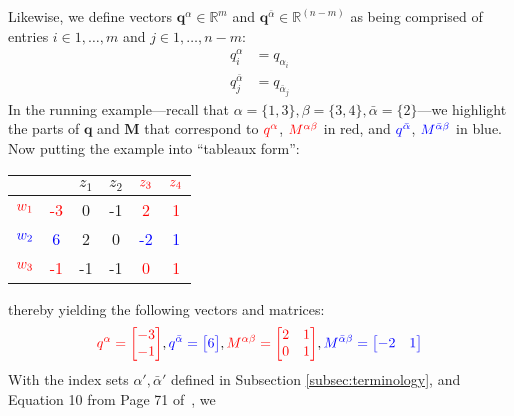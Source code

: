 \documentclass{article}
\providecommand{\vect}[1]{\bm#1}
\providecommand{\mat}[1]{\mathbf#1}
\newcommand{\1}{(\textos{1})\!}
\newcommand{\2}{(\textos{2})\!}
\newcommand{\3}{(\textos{3})\!}
\newcommand{\4}{(\textos{4})\!}
\newcommand{\5}{(\textos{5})\!}
\newcommand{\6}{(\textos{6})\!}
\newcommand{\7}{(\textos{7})\!}
\newcommand{\8}{(\textos{8})\!}
\begin{document}
Likewise, we define vectors $\vect{q}^{\alpha} \in \mathbb{R}^m$ and $\vect{q}^{\bar{\alpha}} \in \mathbb{R}^{(n-m)}$ as being comprised of entries $i \in 1,\ldots,m$ and $j \in 1, \ldots, n-m$:
\begin{align*}
	q^{\alpha}_i & = q_{\alpha_i} \\
	q^{\bar{\alpha}}_j & = q_{\bar{\alpha}_j}
\end{align*}
In the running example---recall that $\alpha = \{1, 3\}, \beta = \{3, 4\},
\bar{\alpha} = \{2 \}$---we highlight the parts of $\vect{q}$ and $\mat{M}$ that correspond to $\textcolor{red}{q^{\alpha}}$, $\textcolor{red}{M^{\alpha\beta}}$ in red, and $\textcolor{blue}{q^{\bar{\alpha}}}$, $\textcolor{blue}{M^{\bar{\alpha}\beta}}$ in blue. Now putting the example into ``tableaux form'':
\begin{center}
	\begin{tabular}{|c|c|c c c c|}
		\hline
		      &  & $z_1$ & $z_2$ & $\textcolor{red}{z_3}$ & $\textcolor{red}{z_4}$\\
		\hline
		$\textcolor{red}{w_1}$ &\textcolor{red}{-3} & 0 & -1 & \textcolor{red}{2} & \textcolor{red}{1}\\
		$\textcolor{blue}{w_2}$ & \textcolor{blue}{6} & 2 & 0 & \textcolor{blue}{-2} & \textcolor{blue}{1}\\
		$\textcolor{red}{w_3}$ & \textcolor{red}{-1} & -1 & -1 & \textcolor{red}{0} & \textcolor{red}{1}\\
		\hline
	\end{tabular}
\end{center}
thereby yielding the following vectors and matrices:
\begin{align*}
		\textcolor{red}{q^{\alpha} = \begin{bmatrix} -3 \\ -1\end{bmatrix}},
		\textcolor{blue}{q^{\bar{\alpha}} = \begin{bmatrix} 6\end{bmatrix}},
		\textcolor{red}{M^{\alpha\beta} = \begin{bmatrix} 2 & 1 \\ 0 & 1\end{bmatrix}},
		\textcolor{blue}{M^{\bar{\alpha}\beta} = \begin{bmatrix} -2 & 1 \end{bmatrix}}
\end{align*}
With the index sets $\alpha', \bar{\alpha}'$ defined in Subsection
\ref{subsec:terminology}, and Equation 10 from Page 71 of~\cite{Cottle:1992}, we
\end{document}
